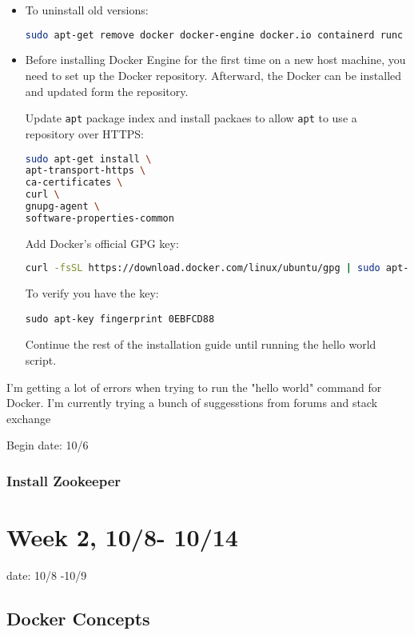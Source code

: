 \begin{itemize}
\item To uninstall old versions:
\begin{lstlisting}[language=bash]
sudo apt-get remove docker docker-engine docker.io containerd runc
\end{lstlisting}

\item Before installing Docker Engine for the first time on a new host machine, you need to set up the Docker repository. Afterward, the Docker can be installed and updated form the repository.

Update \texttt{apt} package index and install packaes to allow \texttt{apt} to use a repository over HTTPS:
\begin{lstlisting}[language=bash]
sudo apt-get install \
apt-transport-https \
ca-certificates \
curl \
gnupg-agent \
software-properties-common
\end{lstlisting}

Add Docker's official GPG key:
\begin{lstlisting}[language=bash]
curl -fsSL https://download.docker.com/linux/ubuntu/gpg | sudo apt-key add -
\end{lstlisting}

To verify you have the key:
\begin{lstlisting}
sudo apt-key fingerprint 0EBFCD88
\end{lstlisting}

Continue the rest of the installation guide until running the hello world script.
\end{itemize}

I'm getting a lot of errors when trying to run the "hello world" command for Docker. I'm currently trying a bunch of suggesstions from forums and stack exchange

Begin date: 10/6

\subsubsection*{Install Zookeeper}




\section*{Week 2, 10/8- 10/14}
date: 10/8 -10/9

\subsection*{Docker Concepts}






